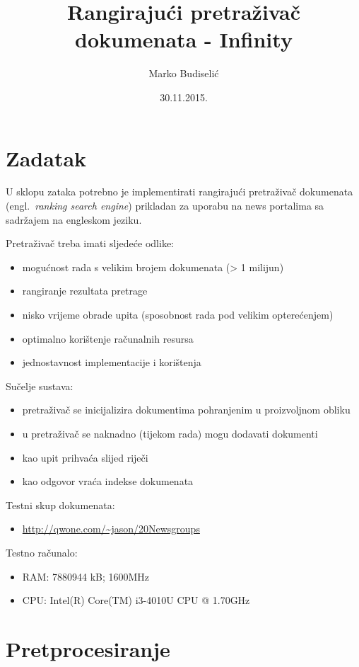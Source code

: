 \documentclass[a4paper,12pt]{article}
\title{Rangirajući pretraživač dokumenata - Infinity}
\author{Marko Budiselić}
\date{30.11.2015.}
\newcommand{\engl}[1]{(engl.~\emph{#1})}
\begin{document}
\maketitle

\section{Zadatak}

U sklopu zataka potrebno je implementirati rangirajući pretraživač dokumenata \engl{ranking search engine} prikladan za uporabu na news portalima sa sadržajem na engleskom jeziku.

Pretraživač treba imati sljedeće odlike:
\begin{itemize}
\item mogućnost rada s velikim brojem dokumenata (> 1 milijun)
\item rangiranje rezultata pretrage
\item nisko vrijeme obrade upita (sposobnost rada pod velikim opterećenjem)
\item optimalno korištenje računalnih resursa
\item jednostavnost implementacije i korištenja
\end{itemize}

Sučelje sustava:
\begin{itemize}
\item pretraživač se inicijalizira dokumentima pohranjenim u proizvoljnom obliku
\item u pretraživač se naknadno (tijekom rada) mogu dodavati dokumenti
\item kao upit prihvaća slijed riječi
\item kao odgovor vraća indekse dokumenata
\end{itemize}

Testni skup dokumenata:
\begin{itemize}
\item \url{http://qwone.com/~jason/20Newsgroups}
\end{itemize}

Testno računalo:
\begin{itemize}
\item RAM: 7880944 kB; 1600MHz
\item CPU: Intel(R) Core(TM) i3-4010U CPU @ 1.70GHz
\end{itemize}

\section{Pretprocesiranje}
\end{document}
